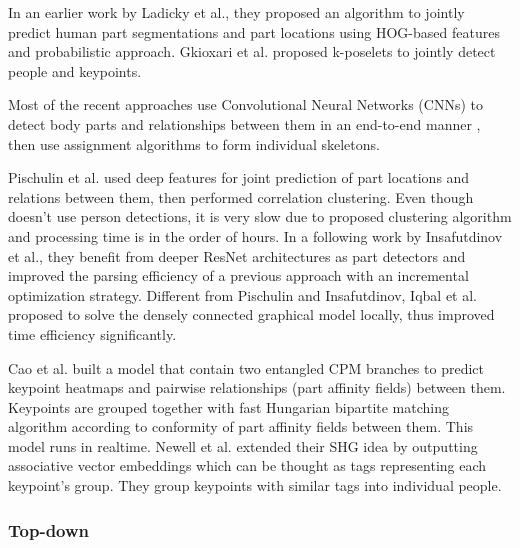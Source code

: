 \documentclass[runningheads]{llncs}
\begin{document}
In an earlier work by Ladicky et al.\cite{LadickyETHZurich}, they proposed an algorithm to jointly predict human part segmentations and part locations using HOG-based features and probabilistic approach. Gkioxari et al. \cite{Gkioxari2013} proposed k-poselets to jointly detect people and keypoints. 


Most of the  recent approaches use Convolutional Neural Networks (CNNs) to detect body parts and relationships between them in an end-to-end manner \cite{Cao2016, Newell2016b, Varadarajan2017, Pishchulin2015a, Pishchulin2013, Insafutdinov2016}, then use assignment algorithms \cite{Cao2016,Pishchulin2015a,Insafutdinov2016,Varadarajan2017} to form individual skeletons. 


Pischulin et al.\cite{Pishchulin2015a} used deep features for joint prediction of part locations and relations between them, then performed correlation clustering. Even though \cite{Pishchulin2015a} doesn't use person detections, it is very slow due to proposed clustering algorithm and processing time is in the order of hours. In a following work by Insafutdinov et al.\cite{Insafutdinov2016}, they benefit from deeper ResNet architectures as part detectors and improved the parsing efficiency of a previous approach with an incremental optimization strategy. Different from Pischulin and Insafutdinov, Iqbal et al. \cite{Iqbal2016} proposed to solve the densely connected graphical model locally, thus improved time efficiency significantly.  


Cao et al.\cite{Cao2016} built a model that contain two entangled CPM\cite{Wei2016} branches to predict keypoint heatmaps and pairwise relationships (part affinity fields) between them. Keypoints are grouped together with fast Hungarian bipartite matching algorithm according to conformity of part affinity fields between them. This model runs in realtime. Newell et al.\cite{Newell2016b} extended their SHG idea by outputting associative vector embeddings which can be thought as tags representing each keypoint's group. They group keypoints with similar tags into individual people.


\subsubsection{Top-down}
\end{document}
